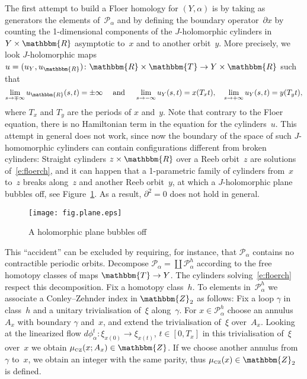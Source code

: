 \documentclass[12pt,twoside]{amsart}
\theoremstyle{plain}
\numberwithin{figure}{section}
\numberwithin{equation}{section}
\def\sCZ{ {\scriptscriptstyle\operatorname{CZ}}}
\def\ga{\alpha}
\def\gg{\gamma}
\def\cp{{\mathcal P}}
\def\RR{\mathbbm{R}}
\def\TT{\mathbbm{T}}
\def\ZZ{\mathbbm{Z}}
\def\pp{\partial}
\begin{document}
The first attempt to build a Floer homology for $(Y,\ga)$ is by taking as generators the elements of~$\cp_\ga$
and by defining the boundary operator~$\pp x$ by counting the 1-dimensional components of the 
$J$-holomorphic cylinders in $Y \times \RR$ asymptotic to~$x$ and to another orbit~$y$. 
More precisely, we look $J$-holomorphic maps 
$u = (u_Y, u_{\RR}) \colon \RR \times \TT \to Y \times \RR$
such that 
%
\begin{equation} \label{e:floerch}
\lim_{s \to \mp \infty} u_{\RR}(s,t) = \pm \infty
\quad \mbox{ and } \quad
\lim_{s \to -\infty} u_Y(s,t) = x (T_xt), \quad 
\lim_{s \to +\infty} u_Y(s,t) = y (T_yt),
\end{equation}
where $T_x$ and $T_y$ are the periods of $x$ and~$y$.
Note that contrary to the Floer equation, there is no Hamiltonian term in the equation for the cylinders~$u$.
%
This attempt in general does not work, since now
the boundary of the space of such $J$-homomorphic cylinders 
can contain configurations different from broken cylinders:
Straight cylinders $z \times \RR$ over a Reeb orbit~$z$
are solutions of~\eqref{e:floerch},
and it can happen that a 1-parametric family of cylinders
from~$x$ to~$z$ breaks along~$z$ and another Reeb orbit~$y$,
at which a $J$-holomorphic plane bubbles off, see Figure~\ref{fig.plane}.
As a result, $\pp^2 =0$ does not hold in general.


\begin{figure}[h]   
 \begin{center}
  \leavevmode\texttt{[image: fig.plane.eps]}
 \end{center}
 \caption{A holomorphic plane bubbles off}  \label{fig.plane}
\end{figure}

This ``accident'' can be excluded by requiring, for instance, that $\cp_\ga$ contains no contractible
periodic orbits.
Decompose $\cp_\ga = \coprod \cp_\ga^h$ according to the free homotopy classes of maps $\TT \to Y$.
The cylinders solving~\eqref{e:floerch} respect this decomposition.
Fix a homotopy class~$h$.
To elements in~$\cp_\ga^h$ we associate a Conley--Zehnder index in $\ZZ_2$ as follows:
Fix a loop $\gamma$ in class~$h$ and a unitary trivialisation of~$\xi$ along~$\gamma$.
For $x \in \cp_\ga^h$ choose an annulus~$A_x$ with boundary $\gamma$ and~$x$,
and extend the trivialisation of~$\xi$ over~$A_x$.
Looking at the linearized flow $d \phi_{\ga}^t \colon \xi_{x(0)} \to \xi_{x (t)}$, 
$t \in [0,T_x]$ in this trivialisation of~$\xi$ over~$x$ we 
obtain $\mu_{\sCZ}(x;A_x) \in \ZZ$.
If we choose another annulus from $\gg$ to~$x$, we obtain an integer with the same parity,
thus $\mu_{\sCZ}(x) \in \ZZ_2$ is defined.
\end{document}
